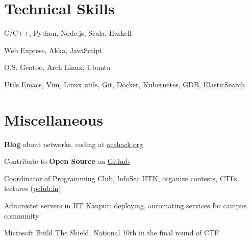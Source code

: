 \documentclass{tccv}
\begin{document}
\vspace{-0.4cm}
\section{Technical Skills}

C/C++, Python, Node.js, Scala, Haskell

\vspace{0.2cm}
\begin{factlist}

\item{\small{Web}}
  {Express, Akka, JavaScript}

\item{\small{O.S.}}
  {Gentoo, Arch Linux, Ubuntu}

\item {\small{Utils}}
  {Emacs, Vim, Linux utils, Git, Docker,
    Kubernetes, GDB, ElasticSearch}

\end{factlist}

\vspace{-0.6cm}
\section{Miscellaneous}
\vspace{0.2cm}
\begin{thinitemize}
\item \textbf{Blog} about networks, coding at \href{http://acehack.org}{acehack.org}
\item Contribute to \textbf{Open Source}
  on \href{https://github.com/sakshamsharma}{Github}
\item Coordinator of Programming Club, InfoSec IITK, organize
  contests, CTFs, lectures (\href{http://pclub.in}{pclub.in})
\item Administer servers in IIT Kanpur; deploying,
  automating services for campus community
\item Microsoft Build The Shield, National 10th in the final round of CTF
\end{thinitemize}
\end{document}
